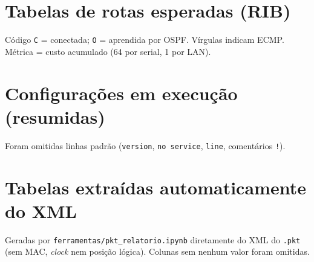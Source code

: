 \documentclass[12pt,a4paper]{article}
\begin{document}
\appendix
\section{Tabelas de rotas esperadas (RIB)}
Código \texttt{C} = conectada; \texttt{O} = aprendida por OSPF. Vírgulas indicam ECMP. Métrica = custo acumulado (64 por serial, 1 por LAN).\\[4pt]


\section{Configurações em execução (resumidas)}
Foram omitidas linhas padrão (\texttt{version}, \texttt{no service}, \texttt{line}, comentários \texttt{!}).\\[4pt]

\section{Tabelas extraídas automaticamente do XML}
Geradas por \texttt{ferramentas/pkt\_relatorio.ipynb} diretamente do XML do \texttt{.pkt} (sem MAC, \textit{clock} nem posição lógica). Colunas sem nenhum valor foram omitidas.\\[4pt]

\end{document}
